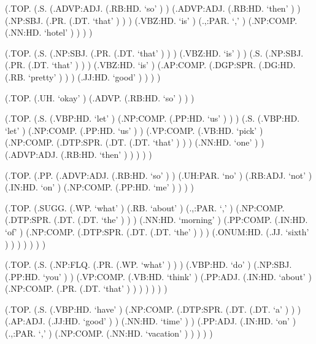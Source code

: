 \documentclass[10pt]{article}
\begin{document}
\begin{parsetree}  (.TOP. (.S. (.ADVP:ADJ. (.RB:HD. `so' ) ) (.ADVP:ADJ. (.RB:HD. `then' ) ) (.NP:SBJ. (.PR. (.DT. `that' ) ) ) (.VBZ:HD. `is' ) (.,:PAR. `,' ) (.NP:COMP. (.NN:HD. `hotel' ) ) ) ) \end{parsetree}

\begin{parsetree}  (.TOP. (.S. (.NP:SBJ. (.PR. (.DT. `that' ) ) ) (.VBZ:HD. `is' ) ) (.S. (.NP:SBJ. (.PR. (.DT. `that' ) ) ) (.VBZ:HD. `is' ) (.AP:COMP. (.DGP:SPR. (.DG:HD. (.RB. `pretty' ) ) ) (.JJ:HD. `good' ) ) ) ) \end{parsetree}

\begin{parsetree}  (.TOP. (.UH. `okay' ) (.ADVP. (.RB:HD. `so' ) ) ) \end{parsetree}

\begin{parsetree}  (.TOP. (.S. (.VBP:HD. `let' ) (.NP:COMP. (.PP:HD. `us' ) ) ) (.S. (.VBP:HD. `let' ) (.NP:COMP. (.PP:HD. `us' ) ) (.VP:COMP. (.VB:HD. `pick' ) (.NP:COMP. (.DTP:SPR. (.DT. (.DT. `that' ) ) ) (.NN:HD. `one' ) ) (.ADVP:ADJ. (.RB:HD. `then' ) ) ) ) ) \end{parsetree}

\begin{parsetree}  (.TOP. (.PP. (.ADVP:ADJ. (.RB:HD. `so' ) ) (.UH:PAR. `no' ) (.RB:ADJ. `not' ) (.IN:HD. `on' ) (.NP:COMP. (.PP:HD. `me' ) ) ) ) \end{parsetree}

\begin{parsetree}  (.TOP. (.SUGG. (.WP. `what' ) (.RB. `about' ) (.,:PAR. `,' ) (.NP:COMP. (.DTP:SPR. (.DT. (.DT. `the' ) ) ) (.NN:HD. `morning' ) (.PP:COMP. (.IN:HD. `of' ) (.NP:COMP. (.DTP:SPR. (.DT. (.DT. `the' ) ) ) (.ONUM:HD. (.JJ. `sixth' ) ) ) ) ) ) ) \end{parsetree}

\begin{parsetree}  (.TOP. (.S. (.NP:FLQ. (.PR. (.WP. `what' ) ) ) (.VBP:HD. `do' ) (.NP:SBJ. (.PP:HD. `you' ) ) (.VP:COMP. (.VB:HD. `think' ) (.PP:ADJ. (.IN:HD. `about' ) (.NP:COMP. (.PR. (.DT. `that' ) ) ) ) ) ) ) \end{parsetree}

\begin{parsetree}  (.TOP. (.S. (.VBP:HD. `have' ) (.NP:COMP. (.DTP:SPR. (.DT. (.DT. `a' ) ) ) (.AP:ADJ. (.JJ:HD. `good' ) ) (.NN:HD. `time' ) ) (.PP:ADJ. (.IN:HD. `on' ) (.,:PAR. `,' ) (.NP:COMP. (.NN:HD. `vacation' ) ) ) ) ) \end{parsetree}
\end{document}
